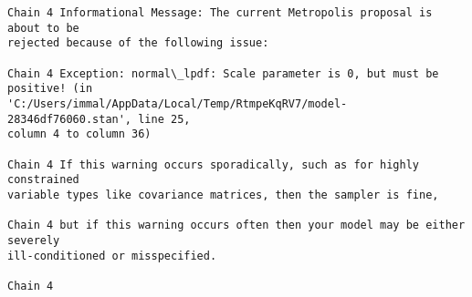 \documentclass[11pt]{article}
\begin{document}
    \begin{Verbatim}[commandchars=\\\{\}]
Chain 4 Informational Message: The current Metropolis proposal is about to be
rejected because of the following issue:

Chain 4 Exception: normal\_lpdf: Scale parameter is 0, but must be positive! (in
'C:/Users/immal/AppData/Local/Temp/RtmpeKqRV7/model-28346df76060.stan', line 25,
column 4 to column 36)

Chain 4 If this warning occurs sporadically, such as for highly constrained
variable types like covariance matrices, then the sampler is fine,

Chain 4 but if this warning occurs often then your model may be either severely
ill-conditioned or misspecified.

Chain 4

    \end{Verbatim}
\end{document}
